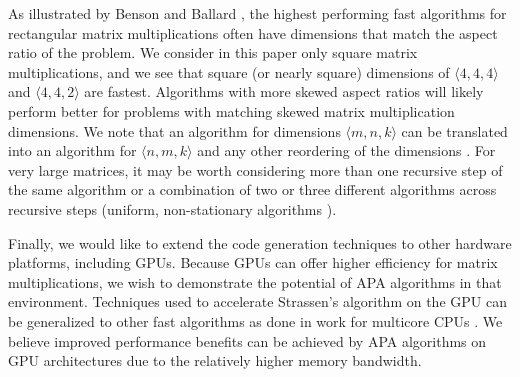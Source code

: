 \documentclass[sigconf,review,anonymous]{acmart}
\newcommand{\dims}[1]{\langle #1 \rangle}
\begin{document}
As illustrated by Benson and Ballard \cite{BB15}, the highest performing fast algorithms for rectangular matrix multiplications often have dimensions that match the aspect ratio of the problem.
We consider in this paper only square matrix multiplications, and we see that square (or nearly square) dimensions of $\dims{4,4,4}$ and $\dims{4,4,2}$ are fastest.
Algorithms with more skewed aspect ratios will likely perform better for problems with matching skewed matrix multiplication dimensions.
We note that an algorithm for dimensions $\dims{m,n,k}$ can be translated into an algorithm for $\dims{n,m,k}$ and any other reordering of the dimensions \cite{BB15}.
For very large matrices, it may be worth considering more than one recursive step of the same algorithm or a combination of two or three different algorithms across recursive steps (uniform, non-stationary algorithms \cite{BBDLS16}).

Finally, we would like to extend the code generation techniques to other hardware platforms, including GPUs.
Because GPUs can offer higher efficiency for matrix multiplications, we wish to demonstrate the potential of APA algorithms in that environment.
Techniques used to accelerate Strassen's algorithm on the GPU \cite{HYvdG20,LAES13} can be generalized to other fast algorithms as done in work for multicore CPUs \cite{BB15,HRMvdG17}.
We believe improved performance benefits can be achieved by APA algorithms on GPU architectures due to the relatively higher memory bandwidth.



%


\balance


\end{document}
